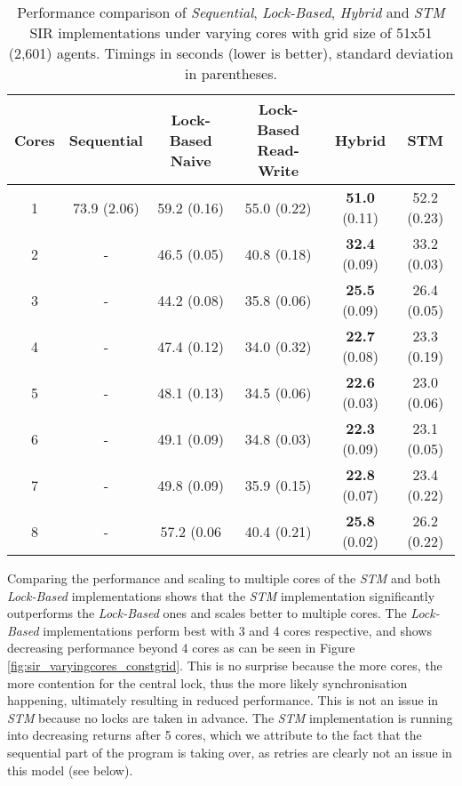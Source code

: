 \begin{table}
	\centering
  	\begin{tabular}{ c || c | c | c | c | c }
        Cores & Sequential  & Lock-Based Naive & Lock-Based Read-Write & Hybrid                & STM          \\ \hline \hline 
   		1     & 73.9 (2.06) & 59.2 (0.16)      & 55.0 (0.22)           & \textbf{51.0} (0.11)  & 52.2 (0.23)  \\ \hline
   		2     & -           & 46.5 (0.05)      & 40.8 (0.18)           & \textbf{32.4} (0.09)  & 33.2 (0.03)  \\ \hline
   		3     & -           & 44.2 (0.08)      & 35.8 (0.06)           & \textbf{25.5} (0.09)  & 26.4 (0.05)  \\ \hline
   		4     & -           & 47.4 (0.12)      & 34.0 (0.32)           & \textbf{22.7} (0.08)  & 23.3 (0.19)  \\ \hline
   		5     & -           & 48.1 (0.13)      & 34.5 (0.06)           & \textbf{22.6} (0.03)  & 23.0 (0.06)  \\ \hline
   		6     & -           & 49.1 (0.09)      & 34.8 (0.03)           & \textbf{22.3} (0.09)  & 23.1 (0.05)  \\ \hline
   		7     & -           & 49.8 (0.09)      & 35.9 (0.15)           & \textbf{22.8} (0.07)  & 23.4 (0.22)  \\ \hline
   		8     & -           & 57.2 (0.06       & 40.4 (0.21)           & \textbf{25.8} (0.02)  & 26.2 (0.22)  \\ \hline \hline
  	\end{tabular}

  	\caption{Performance comparison of \textit{Sequential}, \textit{Lock-Based}, \textit{Hybrid} and \textit{STM} SIR implementations under varying cores with grid size of 51x51 (2,601) agents. Timings in seconds (lower is better), standard deviation in parentheses.}
	\label{tab:sir_varyingcores_constgrid}
\end{table}

Comparing the performance and scaling to multiple cores of the \textit{STM} and both \textit{Lock-Based} implementations shows that the \textit{STM} implementation significantly outperforms the \textit{Lock-Based} ones and scales better to multiple cores. The \textit{Lock-Based} implementations perform best with 3 and 4 cores respective, and shows decreasing performance beyond 4 cores as can be seen in Figure \ref{fig:sir_varyingcores_constgrid}. This is no surprise because the more cores, the more contention for the central lock, thus the more likely synchronisation happening, ultimately resulting in reduced performance. This is not an issue in \textit{STM} because no locks are taken in advance. The \textit{STM} implementation is running into decreasing returns after 5 cores, which we attribute to the fact that the sequential part of the program is taking over, as retries are clearly not an issue in this model (see below).

